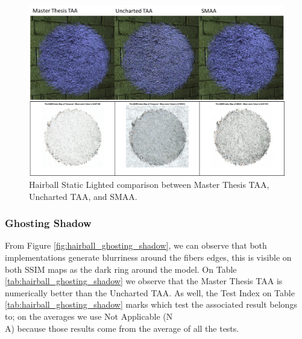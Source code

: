 \documentclass[pregrado]{tesis-usb} %
\begin{document}
\begin{figure}[H]
	\centering
	\includegraphics[scale=0.9]{images/results/hairball_static_lighted.png}
	\caption{Hairball Static Lighted comparison between Master Thesis TAA, Uncharted TAA, and SMAA.}\label{fig:hairball_static_lighted_render}
\end{figure}


\subsubsection{Ghosting Shadow}
From Figure \ref{fig:hairball_ghosting_shadow}, we can observe that both implementations generate blurriness around the fibers edges, this is visible on both SSIM maps as the dark ring around the model. On Table \ref{tab:hairball_ghosting_shadow} we observe that the Master Thesis TAA is numerically better than the Uncharted TAA. As well, the Test Index on Table \ref{tab:hairball_ghosting_shadow} marks which test the associated result belongs to; on the averages we use Not Applicable (N\\A) because those results come from the average of all the tests. 
\end{document}
